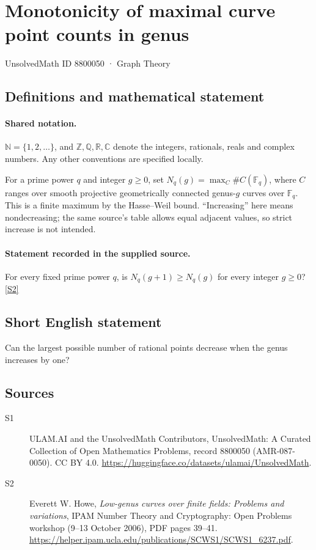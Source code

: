 \documentclass[11pt]{article}
\newcommand{\sref}[2]{\hyperlink{source:#1:#2}{[S#2]}}
\begin{document}
\setcounter{section}{8800049}
\section{Monotonicity of maximal curve point counts in genus}\label{8800050}
{\small\sffamily UnsolvedMath ID 8800050 · Graph Theory}
\subsection{Definitions and mathematical statement}

\paragraph{Shared notation.}$\mathbb N=\{1,2,\ldots\}$, and $\mathbb Z,\mathbb Q,\mathbb R,\mathbb C$ denote the integers, rationals, reals and complex numbers. Any other conventions are specified locally.


For a prime power $q$ and integer $g\ge0$, set $N_q(g)=\max_C\#C(\mathbb F_q)$, where $C$ ranges over smooth projective geometrically connected genus-$g$ curves over $\mathbb F_q$. This is a finite maximum by the Hasse--Weil bound. ``Increasing'' here means nondecreasing; the same source's table allows equal adjacent values, so strict increase is not intended.
\paragraph{Statement recorded in the supplied source.}
For every fixed prime power $q$, is $N_q(g+1)\ge N_q(g)$ for every integer $g\ge0$? \sref{8800050}{2}

\subsection{Short English statement}
Can the largest possible number of rational points decrease when the genus increases by one?
\subsection{Sources}
\begin{description}
\item[\hypertarget{source:8800050:1}{S1}] ULAM.AI and the UnsolvedMath Contributors, UnsolvedMath: A Curated Collection of Open Mathematics Problems, record 8800050 (AMR-087-0050). CC BY 4.0. \url{https://huggingface.co/datasets/ulamai/UnsolvedMath}.
\item[\hypertarget{source:8800050:2}{S2}] Everett W. Howe, \emph{Low-genus curves over finite fields: Problems and variations}, IPAM Number Theory and Cryptography: Open Problems workshop (9--13 October 2006), PDF pages 39--41. \url{https://helper.ipam.ucla.edu/publications/SCWS1/SCWS1_6237.pdf}.
\end{description}
\label{end:8800050}
\end{document}
